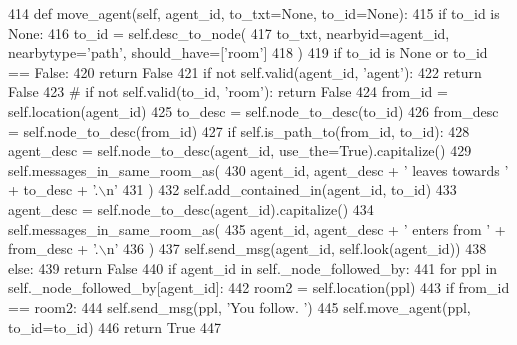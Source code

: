 \begin{DoxyCode}
414     \textcolor{keyword}{def }move\_agent(self, agent\_id, to\_txt=None, to\_id=None):
415         \textcolor{keywordflow}{if} to\_id \textcolor{keywordflow}{is} \textcolor{keywordtype}{None}:
416             to\_id = self.desc\_to\_node(
417                 to\_txt, nearbyid=agent\_id, nearbytype=\textcolor{stringliteral}{'path'}, should\_have=[\textcolor{stringliteral}{'room'}]
418             )
419             \textcolor{keywordflow}{if} to\_id \textcolor{keywordflow}{is} \textcolor{keywordtype}{None} \textcolor{keywordflow}{or} to\_id == \textcolor{keyword}{False}:
420                 \textcolor{keywordflow}{return} \textcolor{keyword}{False}
421         \textcolor{keywordflow}{if} \textcolor{keywordflow}{not} self.valid(agent\_id, \textcolor{stringliteral}{'agent'}):
422             \textcolor{keywordflow}{return} \textcolor{keyword}{False}
423         \textcolor{comment}{# if not self.valid(to\_id, 'room'): return False}
424         from\_id = self.location(agent\_id)
425         to\_desc = self.node\_to\_desc(to\_id)
426         from\_desc = self.node\_to\_desc(from\_id)
427         \textcolor{keywordflow}{if} self.is\_path\_to(from\_id, to\_id):
428             agent\_desc = self.node\_to\_desc(agent\_id, use\_the=\textcolor{keyword}{True}).capitalize()
429             self.messages\_in\_same\_room\_as(
430                 agent\_id, agent\_desc + \textcolor{stringliteral}{' leaves towards '} + to\_desc + \textcolor{stringliteral}{'.\(\backslash\)n'}
431             )
432             self.add\_contained\_in(agent\_id, to\_id)
433             agent\_desc = self.node\_to\_desc(agent\_id).capitalize()
434             self.messages\_in\_same\_room\_as(
435                 agent\_id, agent\_desc + \textcolor{stringliteral}{' enters from '} + from\_desc + \textcolor{stringliteral}{'.\(\backslash\)n'}
436             )
437             self.send\_msg(agent\_id, self.look(agent\_id))
438         \textcolor{keywordflow}{else}:
439             \textcolor{keywordflow}{return} \textcolor{keyword}{False}
440         \textcolor{keywordflow}{if} agent\_id \textcolor{keywordflow}{in} self.\_node\_followed\_by:
441             \textcolor{keywordflow}{for} ppl \textcolor{keywordflow}{in} self.\_node\_followed\_by[agent\_id]:
442                 room2 = self.location(ppl)
443                 \textcolor{keywordflow}{if} from\_id == room2:
444                     self.send\_msg(ppl, \textcolor{stringliteral}{'You follow. '})
445                     self.move\_agent(ppl, to\_id=to\_id)
446         \textcolor{keywordflow}{return} \textcolor{keyword}{True}
447 
\end{DoxyCode}
